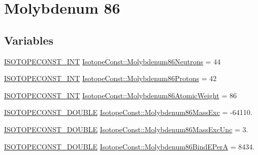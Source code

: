 \hypertarget{group___isotope_const-_molybdenum-_mo86}{}\section{Molybdenum 86}
\label{group___isotope_const-_molybdenum-_mo86}
\subsection*{Variables}
\begin{DoxyCompactItemize}
\item 
\mbox{\hyperlink{group___isotope_const-_macros_ga5f18360b3e99483a35c32d789e62621c}{I\+S\+O\+T\+O\+P\+E\+C\+O\+N\+S\+T\+\_\+\+I\+NT}} \mbox{\hyperlink{group___isotope_const-_molybdenum-_mo86_ga04bfe5e65e5769578f8767c649133843}{Isotope\+Const\+::\+Molybdenum86\+Neutrons}} = 44
\item 
\mbox{\hyperlink{group___isotope_const-_macros_ga5f18360b3e99483a35c32d789e62621c}{I\+S\+O\+T\+O\+P\+E\+C\+O\+N\+S\+T\+\_\+\+I\+NT}} \mbox{\hyperlink{group___isotope_const-_molybdenum-_mo86_ga715951bbf17891cfce0303a7346679b9}{Isotope\+Const\+::\+Molybdenum86\+Protons}} = 42
\item 
\mbox{\hyperlink{group___isotope_const-_macros_ga5f18360b3e99483a35c32d789e62621c}{I\+S\+O\+T\+O\+P\+E\+C\+O\+N\+S\+T\+\_\+\+I\+NT}} \mbox{\hyperlink{group___isotope_const-_molybdenum-_mo86_ga2e9943929df6134406c1e7f4cde27fcc}{Isotope\+Const\+::\+Molybdenum86\+Atomic\+Weight}} = 86
\item 
\mbox{\hyperlink{group___isotope_const-_macros_ga8f45a7272ce02c0b4c65c44636ed719a}{I\+S\+O\+T\+O\+P\+E\+C\+O\+N\+S\+T\+\_\+\+D\+O\+U\+B\+LE}} \mbox{\hyperlink{group___isotope_const-_molybdenum-_mo86_ga1c8fe15e4e35bae9b8a0f8777c9a483c}{Isotope\+Const\+::\+Molybdenum86\+Mass\+Exc}} = -\/64110.
\item 
\mbox{\hyperlink{group___isotope_const-_macros_ga8f45a7272ce02c0b4c65c44636ed719a}{I\+S\+O\+T\+O\+P\+E\+C\+O\+N\+S\+T\+\_\+\+D\+O\+U\+B\+LE}} \mbox{\hyperlink{group___isotope_const-_molybdenum-_mo86_ga82399c6149539fa0a99d6f9e80849428}{Isotope\+Const\+::\+Molybdenum86\+Mass\+Exc\+Unc}} = 3.
\item 
\mbox{\hyperlink{group___isotope_const-_macros_ga8f45a7272ce02c0b4c65c44636ed719a}{I\+S\+O\+T\+O\+P\+E\+C\+O\+N\+S\+T\+\_\+\+D\+O\+U\+B\+LE}} \mbox{\hyperlink{group___isotope_const-_molybdenum-_mo86_gabb899760bbc3a25db12a9990f4a5317d}{Isotope\+Const\+::\+Molybdenum86\+Bind\+E\+PerA}} = 8434.
\item 

\end{DoxyCompactItemize}
